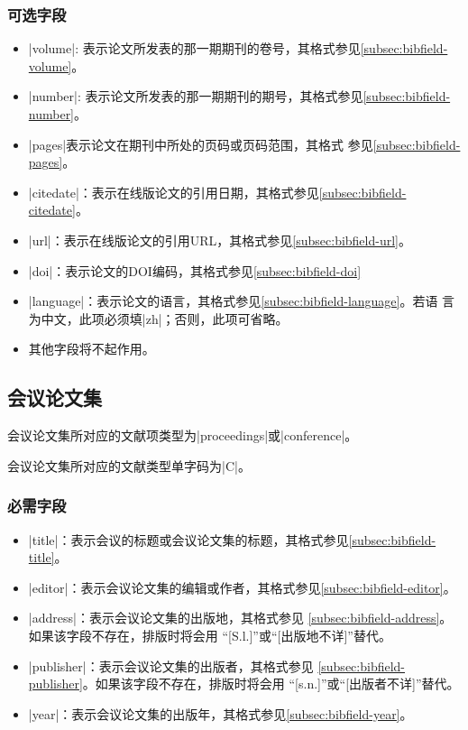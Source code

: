 \subsubsection{可选字段}

\begin{itemize}
\item |volume|: 表示论文所发表的那一期期刊的卷号，其格式参见\ref{subsec:bibfield-volume}。
\item |number|: 表示论文所发表的那一期期刊的期号，其格式参见\ref{subsec:bibfield-number}。
\item |pages|表示论文在期刊中所处的页码或页码范围，其格式
  参见\ref{subsec:bibfield-pages}。
\item |citedate|：表示在线版论文的引用日期，其格式参见\ref{subsec:bibfield-citedate}。
\item |url|：表示在线版论文的引用URL，其格式参见\ref{subsec:bibfield-url}。
\item |doi|：表示论文的DOI编码，其格式参见\ref{subsec:bibfield-doi}
\item |language|：表示论文的语言，其格式参见\ref{subsec:bibfield-language}。若语
  言为中文，此项必须填|zh|；否则，此项可省略。
\item 其他字段将不起作用。
\end{itemize}

\subsection{会议论文集}\label{subsec:bibtype-proceedings}

会议论文集所对应的{\BibTeX}文献项类型为|proceedings|或|conference|。

会议论文集所对应的文献类型\cite{gbt3469-1983}单字码为|C|。

\subsubsection{必需字段}

\begin{itemize}
\item |title|：表示会议的标题或会议论文集的标题，其格式参见\ref{subsec:bibfield-title}。
\item |editor|：表示会议论文集的编辑或作者，其格式参见\ref{subsec:bibfield-editor}。
\item |address|：表示会议论文集的出版地，其格式参见
  \ref{subsec:bibfield-address}。如果该字段不存在，{\BibTeX}排版时将会用
  ``[S.l.]''或``[出版地不详]''替代。
\item |publisher|：表示会议论文集的出版者，其格式参见
  \ref{subsec:bibfield-publisher}。如果该字段不存在，{\BibTeX}排版时将会用
  ``[s.n.]''或``[出版者不详]''替代。
\item |year|：表示会议论文集的出版年，其格式参见\ref{subsec:bibfield-year}。
\end{itemize}


